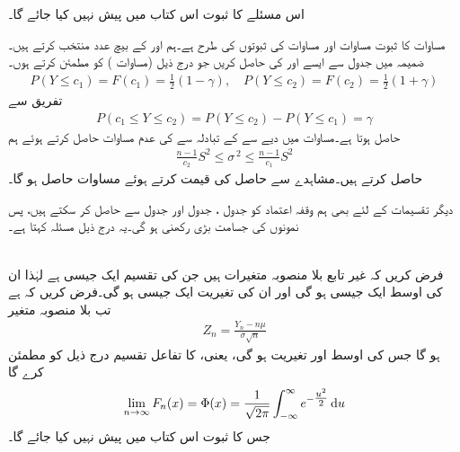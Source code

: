 اس مسئلے کا ثبوت اس کتاب میں پیش نہیں کیا جائے گا۔

مساوات  کا ثبوت مساوات  اور مساوات  کی ثبوتوں کی طرح ہے۔ہم  اور  کے بیچ عدد  منتخب کرتے ہیں۔ضمیمہ  میں جدول  سے ایسے   اور  کی حاصل کریں جو درج ذیل (مساوات ) کو مطمئن کرتے ہوں۔
\begin{align*}
P(Y\le c_1)=F(c_1)=\frac{1}{2}(1-\gamma),\quad P(Y\le c_2)=F(c_2)=\frac{1}{2}(1+\gamma)
\end{align*}
تفریق سے
\begin{align*}
P(c_1\le Y\le c_2)=P(Y\le c_2)-P(Y\le c_1)=\gamma
\end{align*}
حاصل ہوتا ہے۔مساوات  میں دیے  سے  کے تبادلہ سے  کی عدم مساوات حاصل کرتے ہوئے ہم 
\begin{align*}
\frac{n-1}{c_2}S^2\le \sigma^{\,2} \le \frac{n-1}{c_1}S^2
\end{align*} 
حاصل کرتے ہیں۔مشاہدے سے حاصل  کی قیمت  کرتے ہوئے  مساوات  حاصل ہو گا۔

دیگر تقسیمات کے لئے بھی ہم وقفہ اعتماد کو جدول ، جدول  اور جدول  سے حاصل کر سکتے ہیں، پس نمونوں کی جسامت بڑی رکھنی ہو گی۔یہ درج ذیل مسئلہ کہتا ہے۔

\quad {}\\
فرض کریں کہ  غیر تابع بلا منصوبہ متغیرات ہیں جن کی تقسیم ایک جیسی ہے لہٰذا ان کی اوسط  ایک جیسی ہو گی اور ان کی تغیریت   ایک جیسی ہو گی۔فرض کریں کہ  ہے تب بلا منصوبہ متغیر
\begin{align}
Z_n=\frac{Y_n-n\mu}{\sigma \sqrt{n}}
\end{align}
 ہو گا جس کی اوسط  اور تغیریت  ہو گی، یعنی،  کا تفاعل تقسیم  درج ذیل کو مطمئن کرے گا
\begin{align*}
\lim_{n\to \infty} F_n(x)=\Phi(x)=\frac{1}{\sqrt{2\pi}}\int_{-\infty}^{\infty} e^{-\tfrac{u^2}{2}}\dif u
\end{align*}
جس کا ثبوت اس کتاب میں پیش نہیں کیا جائے گا۔

